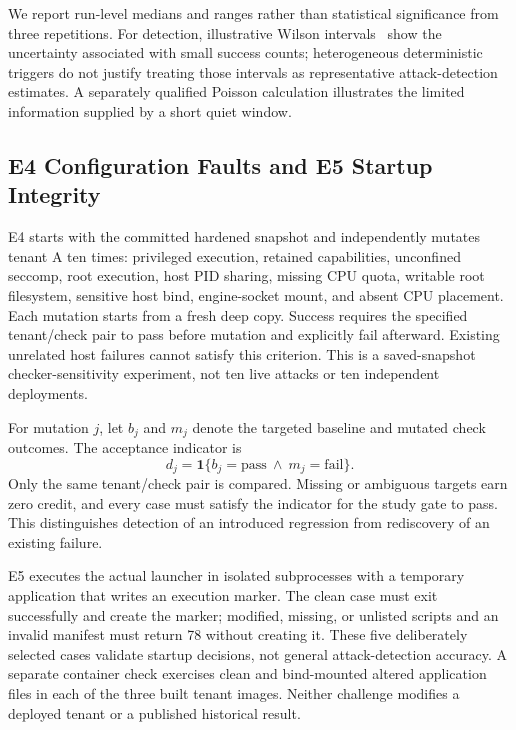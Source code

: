 \documentclass[conference,letterpaper]{IEEEtran}
\begin{document}
We report run-level medians and ranges rather than statistical significance from three repetitions. For detection, illustrative Wilson intervals~\cite{wilson} show the uncertainty associated with small success counts; heterogeneous deterministic triggers do not justify treating those intervals as representative attack-detection estimates. A separately qualified Poisson calculation illustrates the limited information supplied by a short quiet window.

\subsection{E4 Configuration Faults and E5 Startup Integrity}
E4 starts with the committed hardened snapshot and independently mutates tenant A ten times: privileged execution, retained capabilities, unconfined seccomp, root execution, host PID sharing, missing CPU quota, writable root filesystem, sensitive host bind, engine-socket mount, and absent CPU placement. Each mutation starts from a fresh deep copy. Success requires the specified tenant/check pair to pass before mutation and explicitly fail afterward. Existing unrelated host failures cannot satisfy this criterion. This is a saved-snapshot checker-sensitivity experiment, not ten live attacks or ten independent deployments.

For mutation $j$, let $b_j$ and $m_j$ denote the targeted baseline and mutated check outcomes. The acceptance indicator is
\begin{equation}
d_j=\mathbf{1}\{b_j=\mathrm{pass}\ \land\ m_j=\mathrm{fail}\}.
\label{eq:fault}
\end{equation}
Only the same tenant/check pair is compared. Missing or ambiguous targets earn zero credit, and every case must satisfy the indicator for the study gate to pass. This distinguishes detection of an introduced regression from rediscovery of an existing failure.

E5 executes the actual launcher in isolated subprocesses with a temporary application that writes an execution marker. The clean case must exit successfully and create the marker; modified, missing, or unlisted scripts and an invalid manifest must return 78 without creating it. These five deliberately selected cases validate startup decisions, not general attack-detection accuracy. A separate container check exercises clean and bind-mounted altered application files in each of the three built tenant images. Neither challenge modifies a deployed tenant or a published historical result.
\end{document}
